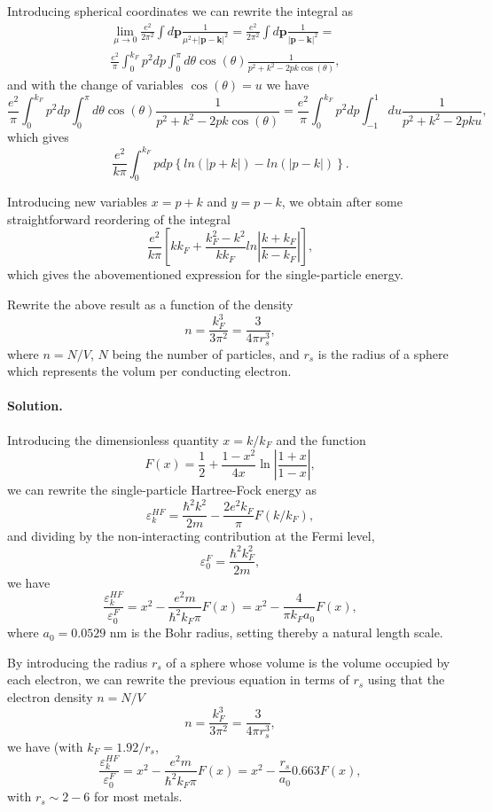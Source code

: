 \documentclass[graybox,sectrefs,envcountresetchap,open=right]{svmonodo}
\newenvironment{doconceexercise}{}{}
\begin{document}
\begin{doconceexercise}
Introducing spherical coordinates we can rewrite the integral as 
\begin{align}
\lim_{\mu \to 0}\frac{e^{2}}{ 2\pi^2}  \int d\mathbf{p}\frac{1}{\mu^2+\vert \mathbf{p}-\mathbf{k}\vert^2}=\frac{e^{2}}{ 2\pi^2}  \int d\mathbf{p}\frac{1}{\vert \mathbf{p}-\mathbf{k}\vert^2}=& \\
\frac{e^{2}}{\pi}  \int_0^{k_F} p^2dp\int_0^{\pi} d\theta\cos{(\theta)}\frac{1}{p^2+k^2-2pk\cos{(\theta)}},
\end{align}
and with the change of variables $\cos{(\theta)}=u$ we have 
\[
\frac{e^{2}}{\pi}  \int_0^{k_F} p^2dp\int_{0}^{\pi} d\theta\cos{(\theta)}\frac{1}{p^2+k^2-2pk\cos{(\theta)}}=\frac{e^{2}}{\pi}  \int_0^{k_F} p^2dp\int_{-1}^{1} du\frac{1}{p^2+k^2-2pku},
\]
which gives
\[
\frac{e^{2}}{k\pi}  \int_0^{k_F} pdp\left\{ln(\vert p+k\vert)-ln(\vert p-k\vert)\right\}.
\]

Introducing new variables $x=p+k$ and $y=p-k$, we obtain after some straightforward reordering of the integral
\[
\frac{e^{2}}{k\pi}\left[
kk_F+\frac{k_{F}^{2}-k^{2}}{kk_{F}}ln\left\vert\frac{k+k_{F}}
{k-k_{F}}\right\vert
\right],
\]
which gives the abovementioned expression for the single-particle energy.


Rewrite the above result as a function of the density
\[
n= \frac{k_F^3}{3\pi^2}=\frac{3}{4\pi r_s^3},
\]
where $n=N/V$, $N$ being the number of particles, and $r_s$ is the radius of a sphere which represents the volum per conducting electron.


\paragraph{Solution.}
Introducing the dimensionless quantity $x=k/k_F$ and the function
\[
F(x) = \frac{1}{2}+\frac{1-x^2}{4x}\ln{\left\vert \frac{1+x}{1-x}\right\vert},
\]
we can rewrite the single-particle Hartree-Fock energy as 
\[
\varepsilon_{k}^{HF}=\frac{\hbar^{2}k^{2}}{2m}-\frac{2e^{2}
k_{F}}{\pi}F(k/k_F),
\]
and dividing by the non-interacting contribution at the Fermi level, 
\[
\varepsilon_{0}^{F}=\frac{\hbar^{2}k_F^{2}}{2m},
\]
we have
\[
\frac{\varepsilon_{k}^{HF} }{\varepsilon_{0}^{F}}=x^2-\frac{e^2m}{\hbar^2 k_F\pi}F(x)=x^2-\frac{4}{\pi k_Fa_0}F(x),
\]
where $a_0=0.0529$ nm is the Bohr radius, setting thereby a natural length scale. 


By introducing the radius $r_s$ of a sphere whose volume is the volume occupied by each electron, we can rewrite the previous equation in terms of $r_s$ using that the electron density $n=N/V$
\[
n=\frac{k_F^3}{3\pi^2} = \frac{3}{4\pi r_s^3},
\]
we have (with $k_F=1.92/r_s$,
\[
\frac{\varepsilon_{k}^{HF} }{\varepsilon_{0}^{F}}=x^2-\frac{e^2m}{\hbar^2 k_F\pi}F(x)=x^2-\frac{r_s}{a_0}0.663F(x),
\]
with $r_s \sim 2-6$ for most metals.


\end{doconceexercise}
\end{document}
